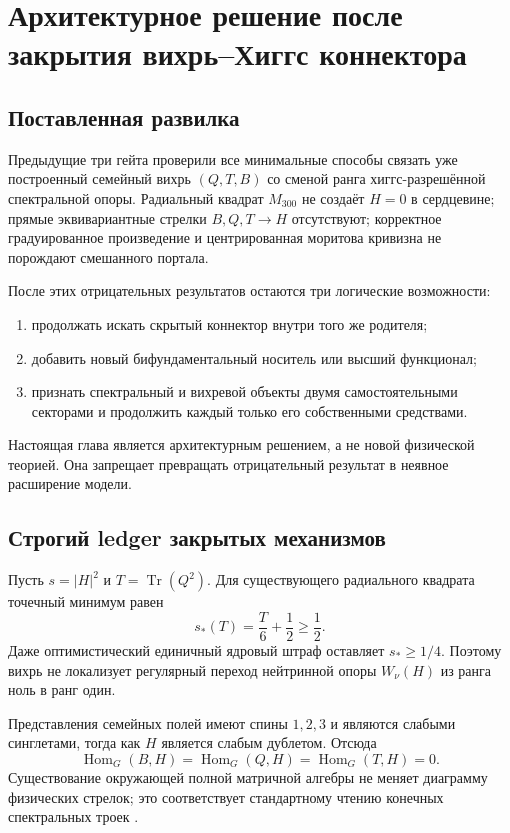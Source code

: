 \chapter{Архитектурное решение после закрытия вихрь--Хиггс коннектора}
\label{ch:v6-spectral-transition-connector-architecture-branch-decision-gate}

\section{Поставленная развилка}

Предыдущие три гейта проверили все минимальные способы связать уже
построенный семейный вихрь $(Q,T,B)$ со сменой ранга хиггс-разрешённой
спектральной опоры. Радиальный квадрат $M_{300}$ не создаёт $H=0$ в
сердцевине; прямые эквивариантные стрелки $B,Q,T\to H$ отсутствуют;
корректное градуированное произведение и центрированная моритова кривизна
не порождают смешанного портала.

После этих отрицательных результатов остаются три логические возможности:
\begin{enumerate}
 \item продолжать искать скрытый коннектор внутри того же родителя;
 \item добавить новый бифундаментальный носитель или высший функционал;
 \item признать спектральный и вихревой объекты двумя самостоятельными
 секторами и продолжить каждый только его собственными средствами.
\end{enumerate}

Настоящая глава является архитектурным решением, а не новой физической
теорией. Она запрещает превращать отрицательный результат в неявное
расширение модели.

\section{Строгий ledger закрытых механизмов}

Пусть $s=|H|^2$ и $T=\operatorname{Tr}(Q^2)$. Для существующего
радиального квадрата точечный минимум равен
\begin{equation}
 s_*(T)=\frac{T}{6}+\frac12\geq\frac12.
\end{equation}
Даже оптимистический единичный ядровый штраф оставляет
$s_*\geq1/4$. Поэтому вихрь не локализует регулярный переход нейтринной
опоры $W_\nu(H)$ из ранга ноль в ранг один.

Представления семейных полей имеют спины $1,2,3$ и являются слабыми
синглетами, тогда как $H$ является слабым дублетом. Отсюда
\begin{equation}
 \operatorname{Hom}_G(B,H)=
 \operatorname{Hom}_G(Q,H)=
 \operatorname{Hom}_G(T,H)=0.
\end{equation}
Существование окружающей полной матричной алгебры не меняет диаграмму
физических стрелок; это соответствует стандартному чтению конечных
спектральных троек \cite{krajewski1998}.

